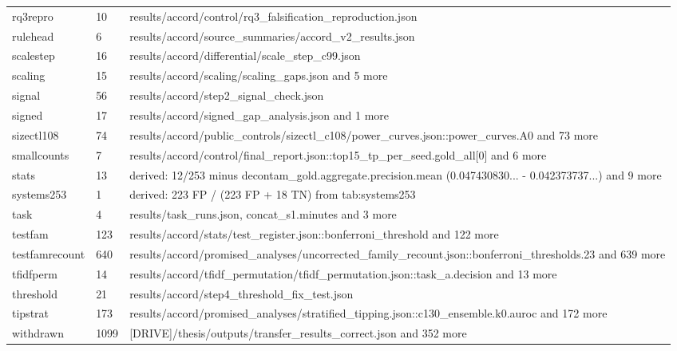 \begin{longtable}{@{}p{1.6in}p{0.6in}p{3.6in}@{}}
rq3repro & 10 & results/\allowbreak{}accord/\allowbreak{}control/\allowbreak{}rq3\_falsification\_reproduction.\allowbreak{}json\\
rulehead & 6 & results/\allowbreak{}accord/\allowbreak{}source\_summaries/\allowbreak{}accord\_v2\_results.\allowbreak{}json\\
scalestep & 16 & results/\allowbreak{}accord/\allowbreak{}differential/\allowbreak{}scale\_step\_c99.\allowbreak{}json\\
scaling & 15 & results/\allowbreak{}accord/\allowbreak{}scaling/\allowbreak{}scaling\_gaps.\allowbreak{}json and 5 more\\
signal & 56 & results/\allowbreak{}accord/\allowbreak{}step2\_signal\_check.\allowbreak{}json\\
signed & 17 & results/\allowbreak{}accord/\allowbreak{}signed\_gap\_analysis.\allowbreak{}json and 1 more\\
sizectl108 & 74 & results/\allowbreak{}accord/\allowbreak{}public\_controls/\allowbreak{}sizectl\_c108/\allowbreak{}power\_curves.\allowbreak{}json::power\_curves.\allowbreak{}A0 and 73 more\\
smallcounts & 7 & results/\allowbreak{}accord/\allowbreak{}control/\allowbreak{}final\_report.\allowbreak{}json::top15\_tp\_per\_seed.\allowbreak{}gold\_all[0] and 6 more\\
stats & 13 & derived: 12/\allowbreak{}253 minus decontam\_gold.\allowbreak{}aggregate.\allowbreak{}precision.\allowbreak{}mean (0.\allowbreak{}047430830.\allowbreak{}.\allowbreak{}.\allowbreak{} - 0.\allowbreak{}042373737.\allowbreak{}.\allowbreak{}.\allowbreak{}) and 9 more\\
systems253 & 1 & derived: 223 FP /\allowbreak{} (223 FP + 18 TN) from tab:systems253\\
task & 4 & results/\allowbreak{}task\_runs.\allowbreak{}json, concat\_s1.\allowbreak{}minutes and 3 more\\
testfam & 123 & results/\allowbreak{}accord/\allowbreak{}stats/\allowbreak{}test\_register.\allowbreak{}json::bonferroni\_threshold and 122 more\\
testfamrecount & 640 & results/\allowbreak{}accord/\allowbreak{}promised\_analyses/\allowbreak{}uncorrected\_family\_recount.\allowbreak{}json::bonferroni\_thresholds.\allowbreak{}23 and 639 more\\
tfidfperm & 14 & results/\allowbreak{}accord/\allowbreak{}tfidf\_permutation/\allowbreak{}tfidf\_permutation.\allowbreak{}json::task\_a.\allowbreak{}decision and 13 more\\
threshold & 21 & results/\allowbreak{}accord/\allowbreak{}step4\_threshold\_fix\_test.\allowbreak{}json\\
tipstrat & 173 & results/\allowbreak{}accord/\allowbreak{}promised\_analyses/\allowbreak{}stratified\_tipping.\allowbreak{}json::c130\_ensemble.\allowbreak{}k0.\allowbreak{}auroc and 172 more\\
withdrawn & 1099 & [DRIVE]/\allowbreak{}thesis/\allowbreak{}outputs/\allowbreak{}transfer\_results\_correct.\allowbreak{}json and 352 more\\
\end{longtable}
\doublespacing

